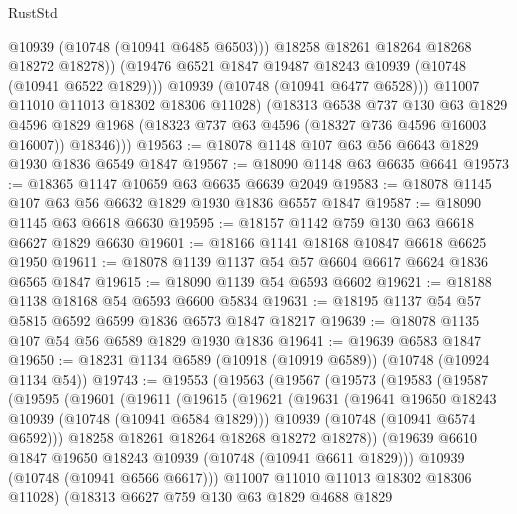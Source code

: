 \begin{lexlean}{RustStd}
\begin{coremodule}
                  @10939
                  (@10748 (@10941 @6485 @6503)))
                @18258
                @18261
                @18264
                @18268
                @18272
                @18278))
            (@19476 @6521 @1847 @19487 @18243 @10939 (@10748 (@10941 @6522 @1829)))
            @10939
            (@10748 (@10941 @6477 @6528)))
          @11007
          @11010
          @11013
          @18302
          @18306
          @11028)
        (@18313
          @6538
          @737
          @130
          @63
          @1829
          @4596
          @1829
          @1968
          (@18323 @737 @63 @4596 (@18327 @736 @4596 @16003 @16007))
          @18346)))
@19563 := @18078 @1148 @107 @63 @56 @6643 @1829 @1930 @1836 @6549 @1847
@19567 := @18090 @1148 @63 @6635 @6641
@19573 := @18365 @1147 @10659 @63 @6635 @6639 @2049
@19583 := @18078 @1145 @107 @63 @56 @6632 @1829 @1930 @1836 @6557 @1847
@19587 := @18090 @1145 @63 @6618 @6630
@19595 := @18157 @1142 @759 @130 @63 @6618 @6627 @1829 @6630
@19601 := @18166 @1141 @18168 @10847 @6618 @6625 @1950
@19611 := @18078 @1139 @1137 @54 @57 @6604 @6617 @6624 @1836 @6565 @1847
@19615 := @18090 @1139 @54 @6593 @6602
@19621 := @18188 @1138 @18168 @54 @6593 @6600 @5834
@19631 := @18195 @1137 @54 @57 @5815 @6592 @6599 @1836 @6573 @1847 @18217
@19639 := @18078 @1135 @107 @54 @56 @6589 @1829 @1930 @1836
@19641 := @19639 @6583 @1847
@19650 := @18231 @1134 @6589 (@10918 (@10919 @6589)) (@10748 (@10924 @1134 @54))
@19743 := @19553
    (@19563
      (@19567
        (@19573
          (@19583
            (@19587
              (@19595
                (@19601
                  (@19611
                    (@19615
                      (@19621
                        (@19631
                          (@19641 @19650 @18243 @10939 (@10748 (@10941 @6584 @1829)))
                          @10939
                          (@10748 (@10941 @6574 @6592)))
                        @18258
                        @18261
                        @18264
                        @18268
                        @18272
                        @18278))
                    (@19639 @6610 @1847 @19650 @18243 @10939 (@10748 (@10941 @6611 @1829)))
                    @10939
                    (@10748 (@10941 @6566 @6617)))
                  @11007
                  @11010
                  @11013
                  @18302
                  @18306
                  @11028)
                (@18313
                  @6627
                  @759
                  @130
                  @63
                  @1829
                  @4688
                  @1829

\end{coremodule}
\end{lexlean}
